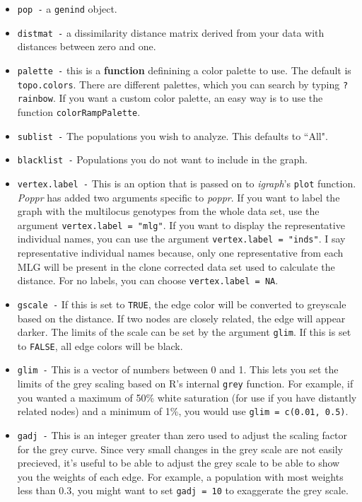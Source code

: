 \documentclass[letterpaper]{article}\usepackage[]{graphicx}\usepackage[]{color}
\newcommand{\poppr}{\textit{poppr}}
\newcommand{\Poppr}{\textit{Poppr}}
\begin{document}
\begin{itemize}
  \item \texttt{pop -} a \texttt{genind} object.
  \item \texttt{distmat -} a dissimilarity distance matrix derived from your data with distances between zero and one.
  \item \texttt{palette -} this is a \textbf{function} definining a color palette to use. The default is \texttt{topo.colors}. There are different palettes, which you can search by typing \texttt{?rainbow}. If you want a custom color palette, an easy way is to use the function \texttt{colorRampPalette}.
  \item \texttt{sublist -} The populations you wish to analyze. This defaults to ``All".
  \item \texttt{blacklist -} Populations you do not want to include in the graph.
  \item \texttt{vertex.label -} This is an option that is passed on to \textit{igraph}'s \texttt{plot} function. \Poppr{} has added two arguments specific to \poppr{}. If you want to label the graph with the multilocus genotypes from the whole data set, use the argument \texttt{vertex.label = "mlg"}. If you want to display the representative individual names, you can use the argument \texttt{vertex.label = "inds"}. I say representative individual names because, only one representative from each MLG will be present in the clone corrected data set used to calculate the distance. For no labels, you can choose \texttt{vertex.label = NA}. 
  \item \texttt{gscale -} If this is set to \texttt{TRUE}, the edge color will be converted to greyscale based on the distance. If two nodes are closely related, the edge will appear darker. The limits of the scale can be set by the argument \texttt{glim}. If this is set to \texttt{FALSE}, all edge colors will be black. 
  \item \texttt{glim -} This is a vector of numbers between 0 and 1. This lets you set the limits of the grey scaling based on R's internal \texttt{grey} function. For example, if you wanted a maximum of 50\% white saturation (for use if you have distantly related nodes) and a minimum of 1\%, you would use \texttt{glim = c(0.01, 0.5)}. 
  \item \texttt{gadj -} This is an integer greater than zero used to adjust the scaling factor for the grey curve. Since very small changes in the grey scale are not easily precieved, it's useful to be able to adjust the grey scale to be able to show you the weights of each edge. For example, a population with most weights less than 0.3, you might want to set \texttt{gadj = 10} to exaggerate the grey scale. 

\end{itemize}
\end{document}
